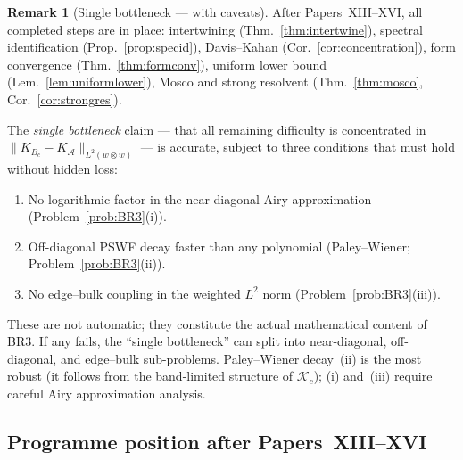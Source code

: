 \documentclass[12pt,a4paper]{amsart}
\theoremstyle{definition}
\newtheorem{remark}[theorem]{Remark}
\newcommand{\Kc}{\mathcal{K}_c}
\newcommand{\cA}{\mathcal{A}}
\begin{document}
\begin{remark}[Single bottleneck --- with caveats]
\label{rem:bottleneck}
After Papers~XIII--XVI, all completed steps are in place:
intertwining (Thm.~\ref{thm:intertwine}),
spectral identification (Prop.~\ref{prop:specid}),
Davis--Kahan (Cor.~\ref{cor:concentration}),
form convergence (Thm.~\ref{thm:formconv}),
uniform lower bound (Lem.~\ref{lem:uniformlower}),
Mosco and strong resolvent (Thm.~\ref{thm:mosco},
Cor.~\ref{cor:strongres}).

The \emph{single bottleneck} claim --- that all remaining difficulty
is concentrated in $\|K_{B_c}-K_{\cA}\|_{L^2(w\otimes w)}$ ---
is accurate, subject to three conditions that must hold without hidden loss:
\begin{enumerate}[nosep,label=(\roman*)]
  \item No logarithmic factor in the near-diagonal Airy approximation
    (Problem~\ref{prob:BR3}(i)).
  \item Off-diagonal PSWF decay faster than any polynomial
    (Paley--Wiener; Problem~\ref{prob:BR3}(ii)).
  \item No edge--bulk coupling in the weighted $L^2$ norm
    (Problem~\ref{prob:BR3}(iii)).
\end{enumerate}
These are not automatic; they constitute the actual mathematical content
of BR3. If any fails, the ``single bottleneck'' can split into
near-diagonal, off-diagonal, and edge--bulk sub-problems.
Paley--Wiener decay~(ii) is the most robust
(it follows from the band-limited structure of $\Kc$);
(i) and~(iii) require careful Airy approximation analysis.
\end{remark}

\subsection*{Programme position after Papers~XIII--XVI}
\end{document}
